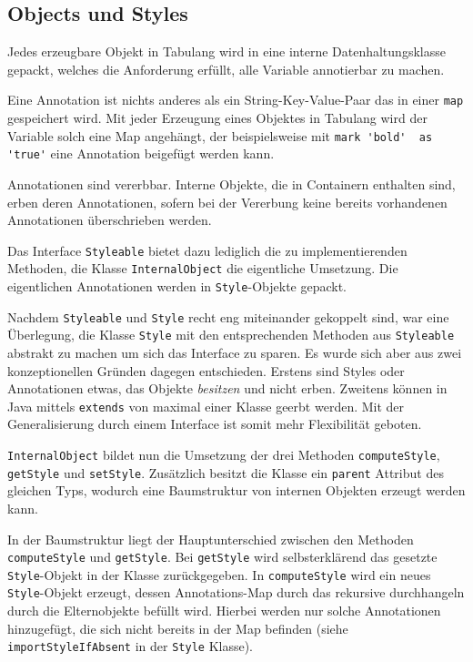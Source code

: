 \subsection{Objects und Styles}

Jedes erzeugbare Objekt in Tabulang wird
in eine interne Datenhaltungsklasse gepackt,
welches die Anforderung erfüllt, alle Variable annotierbar zu machen.

Eine Annotation ist nichts anderes als ein
String-Key-Value-Paar das in einer \lstinline{map} gespeichert wird.
Mit jeder Erzeugung eines Objektes in Tabulang
wird der Variable solch eine Map angehängt, der beispielsweise
mit \lstinline{mark 'bold'  as 'true'} eine Annotation beigefügt
werden kann.

Annotationen sind vererbbar. Interne Objekte, die in Containern
enthalten sind, erben deren Annotationen, sofern bei der Vererbung keine
bereits vorhandenen Annotationen überschrieben werden.

Das Interface \lstinline{Styleable} bietet dazu lediglich die zu
implementierenden Methoden, die Klasse \lstinline{InternalObject}
die eigentliche Umsetzung. Die eigentlichen Annotationen werden in
\lstinline{Style}-Objekte gepackt.

Nachdem \lstinline{Styleable} und \lstinline{Style} recht eng miteinander
gekoppelt sind, war eine Überlegung, die Klasse \lstinline{Style}
mit den entsprechenden Methoden aus \lstinline{Styleable} abstrakt zu
machen um sich das Interface zu sparen. Es wurde sich aber aus zwei
konzeptionellen Gründen dagegen entschieden. Erstens sind Styles oder Annotationen
etwas, das Objekte \textit{besitzen} und nicht erben. Zweitens
können in Java mittels \lstinline{extends} von maximal einer Klasse geerbt
werden. Mit der Generalisierung durch einem Interface ist somit
mehr Flexibilität geboten.

\lstinline{InternalObject} bildet nun die Umsetzung der drei Methoden
\lstinline{computeStyle}, \lstinline{getStyle} und \lstinline{setStyle}.
Zusätzlich besitzt die Klasse ein \lstinline{parent} Attribut des gleichen
Typs, wodurch eine Baumstruktur von internen Objekten erzeugt werden kann.

In der Baumstruktur liegt der Hauptunterschied zwischen den Methoden \lstinline{computeStyle}
und \lstinline{getStyle}. Bei \lstinline{getStyle} wird selbsterklärend das gesetzte
\lstinline{Style}-Objekt in der Klasse zurückgegeben. In \lstinline{computeStyle}
wird ein neues \lstinline{Style}-Objekt erzeugt, dessen Annotations-Map durch das
rekursive durchhangeln durch die Elternobjekte befüllt wird. Hierbei werden nur
solche Annotationen hinzugefügt, die sich nicht bereits in der Map befinden (siehe
\lstinline{importStyleIfAbsent} in der \lstinline{Style} Klasse).\\

